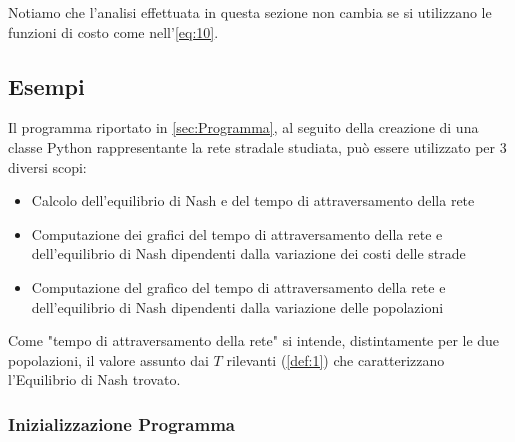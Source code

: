 Notiamo che l'analisi effettuata in questa sezione non cambia se si utilizzano le funzioni di costo come nell'\autoref{eq:10}.


\subsection{Esempi}
\label{subsec:Esempi}

Il programma riportato in \autoref{sec:Programma}, al seguito della creazione di una classe Python \cite{python_docs} rappresentante
la rete stradale studiata, può essere utilizzato per 3 diversi scopi:
\begin{itemize}
    \item Calcolo dell'equilibrio di Nash e del tempo di attraversamento della rete
    \item Computazione dei grafici del tempo di attraversamento della rete e dell'equilibrio di Nash dipendenti dalla variazione dei costi delle strade
    \item Computazione del grafico del tempo di attraversamento della rete e dell'equilibrio di Nash dipendenti dalla variazione delle popolazioni
\end{itemize}
Come "tempo di attraversamento della rete" si intende, distintamente per le due popolazioni, il valore assunto dai $T$ rilevanti (\autoref{def:1})
che caratterizzano l'Equilibrio di Nash trovato.

\subsubsection{Inizializzazione Programma}
\label{subsubsec:InitProgram}

